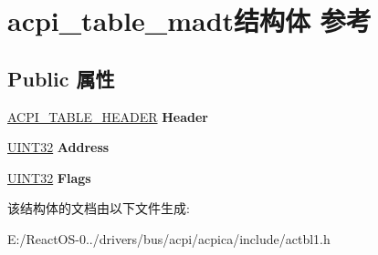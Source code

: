 \hypertarget{structacpi__table__madt}{}\section{acpi\+\_\+table\+\_\+madt结构体 参考}
\label{structacpi__table__madt}
\subsection*{Public 属性}
\begin{DoxyCompactItemize}
\item 
\mbox{\label{structacpi__table__madt_a0670c3333f9d629eaa504ca8026e07c0}} 
\hyperlink{structacpi__table__header}{A\+C\+P\+I\+\_\+\+T\+A\+B\+L\+E\+\_\+\+H\+E\+A\+D\+ER} {\bfseries Header}
\item 
\mbox{\label{structacpi__table__madt_a69e7057c647e86ebfe722f8da9aa3d98}} 
\hyperlink{_processor_bind_8h_ae1e6edbbc26d6fbc71a90190d0266018}{U\+I\+N\+T32} {\bfseries Address}
\item 
\mbox{\label{structacpi__table__madt_ab90e9cfa830aff138af9e3bced2b4679}} 
\hyperlink{_processor_bind_8h_ae1e6edbbc26d6fbc71a90190d0266018}{U\+I\+N\+T32} {\bfseries Flags}
\end{DoxyCompactItemize}


该结构体的文档由以下文件生成\+:\begin{DoxyCompactItemize}
\item 
E\+:/\+React\+O\+S-\/0../drivers/bus/acpi/acpica/include/actbl1.\+h\end{DoxyCompactItemize}
